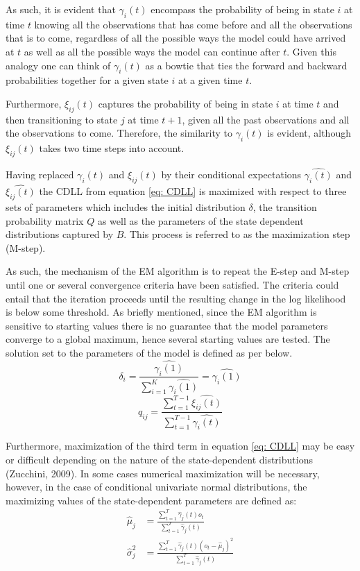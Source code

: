 As such, it is evident that $\gamma_i(t)$ encompass the probability of being in state $i$ at time $t$ knowing all the observations that has come before and all the observations that is to come, regardless of all the possible ways the model could have arrived at $t$ as well as all the possible ways the model can continue after $t$. Given this analogy one can think of $\gamma_i(t)$ as a bowtie that ties the forward and backward probabilities together for a given state $i$ at a given time $t$. 

Furthermore, $\xi_{ij}(t)$ captures the probability of being in state $i$ at time $t$ and then transitioning to state $j$ at time $t+1$, given all the past observations and all the observations to come. Therefore, the similarity to $\gamma_i(t)$ is evident, although $\xi_{ij}(t)$ takes two time steps into account. 

Having replaced $\gamma_i(t)$ and $\xi_{ij}(t)$ by their conditional expectations $\hat{\gamma_i(t)}$ and $\hat{\xi_{ij}(t)}$ the CDLL from equation \ref{eq: CDLL} is maximized with respect to three sets of parameters which includes the initial distribution $\delta$, the transition probability matrix $Q$ as well as the parameters of the state dependent distributions captured by $B$. This process is referred to as the maximization step (M-step). 

As such, the mechanism of the EM algorithm is to repeat the E-step and M-step until one or several convergence criteria have been satisfied. The criteria could entail that the iteration proceeds until the resulting change in the log likelihood is below some threshold. As briefly mentioned, since the EM algorithm is sensitive to starting values there is no guarantee that the model parameters converge to a global maximum, hence several starting values are tested. The solution set to the parameters of the model is defined as per below. 
\begin{equation}
    \delta_i = \frac{\hat{\gamma_i(1)}}{\sum_{i=1}^K\hat{\gamma_i(1)}} = \hat{\gamma_i(1)}
\end{equation}
\begin{equation}
    q_{ij} = \frac{\sum_{t=1}^{T-1}\hat{\xi_{ij}(t)}}{\sum_{t=1}^{T-1}\hat{\gamma_i(t)}}
\end{equation}

Furthermore, maximization of the third term in equation \ref{eq: CDLL} may be easy or difficult depending on the nature of the state-dependent distributions (Zucchini, 2009). In some cases numerical maximization will be necessary, however, in the case of conditional univariate normal
distributions, the maximizing values of the state-dependent parameters are defined as:
\begin{align}
    \hat\mu_j &= \frac{\sum_{t=1}^T\hat\gamma_j(t)o_t}{\sum_{t=1}^T \hat\gamma_j(t)} \\
    \hat\sigma_j^2 &= \frac{\sum_{t=1}^T\hat\gamma_j(t)(o_t-\hat\mu_j)^2}{\sum_{t=1}^T \hat\gamma_j(t)}
\end{align}

